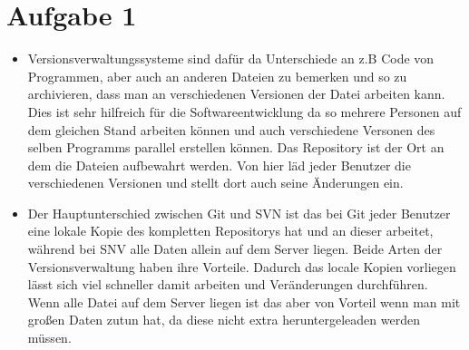\documentclass [DIN,DIV=14,pagenumber=false,parskip=full,fromalign=left,%
fontsize=12pt,%
subject=beforeopening] {scrartcl}
\date{\today}
\begin{document}
\thispagestyle{fancy}

\section*{Aufgabe 1}
\begin{itemize}
\item Versionsverwaltungssysteme sind dafür da Unterschiede an z.B Code von Programmen, aber auch an anderen Dateien zu bemerken und so zu archivieren, dass man an verschiedenen Versionen der Datei arbeiten kann. Dies ist sehr hilfreich für die Softwareentwicklung da so mehrere Personen auf dem gleichen Stand arbeiten können und auch verschiedene Versonen des selben Programms parallel erstellen können. Das Repository ist der Ort an dem die Dateien aufbewahrt werden. Von hier läd jeder Benutzer die verschiedenen Versionen und stellt dort auch seine Änderungen ein.
\end{itemize}

\begin{itemize}
\item Der Hauptunterschied zwischen Git und SVN ist das bei Git jeder Benutzer eine lokale Kopie des kompletten Repositorys hat und an dieser arbeitet, während bei SNV alle Daten allein auf dem Server liegen. Beide Arten der Versionsverwaltung haben ihre Vorteile. Dadurch das locale Kopien vorliegen lässt sich viel schneller damit arbeiten und Veränderungen durchführen. Wenn alle Datei auf dem Server liegen ist das aber von Vorteil wenn man mit großen Daten zutun hat, da diese nicht extra heruntergeleaden werden müssen.
\end{itemize}
\end{document}
